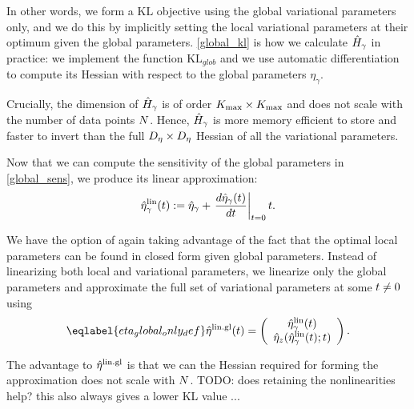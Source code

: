 In other words, we form a $\mathrm{KL}$ objective using the global variational parameters only,
and we do this by implicitly setting the local variational parameters at their optimum
given the global parameters.
\eqref{global_kl} is how we calculate $\hat{H}_\gamma$ in practice:
we implement the function $\mathrm{KL}_{glob}$ and we use automatic differentiation to
compute its Hessian with respect to the global parameters $\eta_\gamma$.

Crucially, the dimension of $\hat{H}_\gamma$ is of order ${K_{\mathrm{max}}} \times {K_{\mathrm{max}}}$
and does not scale with the number of data points $N$.
Hence, $\hat{H}_\gamma$ is more memory efficient to store
and faster to invert
than the full ${D_{\eta}}\times{D_{\eta}}$ Hessian of all the variational parameters.


Now that we can compute the sensitivity of the global parameters in
\eqref{global_sens}, we produce its linear approximation:
\begin{align*}
  \hat\eta^{\mathrm{lin}}_\gamma(t) := \hat\eta_\gamma +
  \left.\frac{d \hat\eta_\gamma(t)}{d t}\right\vert_{t=0} t .
\end{align*}

We have the option of again taking advantage of the fact that the optimal
local parameters can be found in closed form given global parameters.
Instead of linearizing both local and variational parameters,
we linearize only the global parameters and approximate
the full set of variational parameters at some $t \not= 0$ using
\begin{align}\eqlabel{eta_global_only_def}
\etalinglobal(\t) = \left(\begin{array}{c} \etalin_\gamma(\t) \\
\etaoptz(\etalin_\gamma(\t); \t)
\end{array}\right).
\end{align}

The advantage to $\hat\eta^{\mathrm{lin.gl}}$ is that we can the Hessian
required for forming the approximation does not scale with $N$.
TODO: does retaining the nonlinearities help?
this also always gives a lower KL value ...




